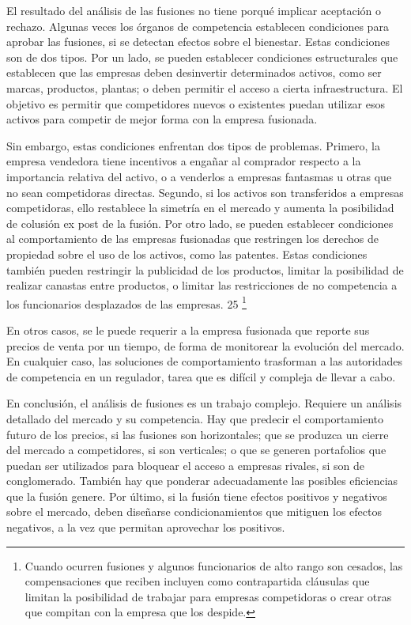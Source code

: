 \documentclass[
  12pt,
  spanish,
]{book}
\begin{document}
El resultado del análisis de las fusiones no tiene porqué implicar aceptación o rechazo. Algunas veces los órganos de competencia establecen condiciones para aprobar las fusiones, si se detectan efectos sobre el bienestar. Estas condiciones son de dos tipos. Por un lado, se pueden establecer condiciones estructurales que establecen que las empresas deben desinvertir determinados activos, como ser marcas, productos, plantas; o deben permitir el acceso a cierta infraestructura. El objetivo es permitir que competidores nuevos o existentes puedan utilizar esos activos para competir de mejor forma con la empresa fusionada.

Sin embargo, estas condiciones enfrentan dos tipos de problemas. Primero, la empresa vendedora tiene incentivos a engañar al comprador respecto a la importancia relativa del activo, o a venderlos a empresas fantasmas u otras que no sean competidoras directas. Segundo, si los activos son transferidos a empresas competidoras, ello restablece la simetría en el mercado y aumenta la posibilidad de colusión ex post de la fusión. Por otro lado, se pueden establecer condiciones al comportamiento de las empresas fusionadas que restringen los derechos de propiedad sobre el uso de los activos, como las patentes.
Estas condiciones también pueden restringir la publicidad de los productos, limitar la posibilidad de realizar canastas entre productos, o limitar las restricciones de no competencia a los funcionarios desplazados de las empresas. 25
\footnote{Cuando ocurren fusiones y algunos funcionarios de alto rango son cesados, las compensaciones que reciben incluyen como contrapartida cláusulas que limitan la posibilidad de trabajar para empresas competidoras o crear otras que compitan con la empresa que los despide.}

En otros casos, se le puede requerir a la empresa fusionada que reporte sus precios de venta por un tiempo, de forma de monitorear la evolución del mercado. En cualquier caso, las soluciones de comportamiento trasforman a las autoridades de competencia en un regulador, tarea que es difícil y compleja de llevar a cabo.

En conclusión, el análisis de fusiones es un trabajo complejo. Requiere un análisis detallado del mercado y su competencia. Hay que predecir el comportamiento futuro de los precios, si las fusiones son horizontales; que se produzca un cierre del mercado a competidores, si son verticales; o que se generen portafolios que puedan ser utilizados para bloquear el acceso a empresas rivales, si son de conglomerado. También hay que ponderar adecuadamente las posibles eficiencias que la fusión genere. Por último, si la fusión tiene efectos positivos y negativos sobre el mercado, deben diseñarse condicionamientos que mitiguen los efectos negativos, a la vez que permitan aprovechar los positivos.
\end{document}
